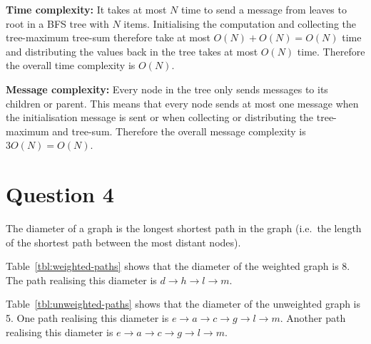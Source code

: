 \documentclass[a4paper,onecolumn,oneside]{article}
\begin{document}
\textbf{Time complexity:}  It takes at most $N$ time to send a message from
leaves to root in a BFS tree with $N$ items.  Initialising the computation and
collecting the tree-maximum tree-sum therefore take at most $O(N) + O(N) = O(N)$
time and distributing the values back in the tree takes at most $O(N)$ time.
Therefore the overall time complexity is $O(N)$.

\textbf{Message complexity:}  Every node in the tree only sends messages to its
children or parent.  This means that every node sends at most one message when
the initialisation message is sent or when collecting or distributing the
tree-maximum and tree-sum.  Therefore the overall message complexity is $3O(N) =
O(N)$.

\section*{Question 4}

The diameter of a graph is the longest shortest path in the graph (i.e.\ the
length of the shortest path between the most distant nodes).

Table~\ref{tbl:weighted-paths} shows that the diameter of the weighted graph is
8.  The path realising this diameter is $d\rightarrow h\rightarrow l\rightarrow
m$.

Table~\ref{tbl:unweighted-paths} shows that the diameter of the unweighted graph
is 5.  One path realising this diameter is $e\rightarrow a\rightarrow
c\rightarrow g\rightarrow l\rightarrow m$.  Another path realising this diameter
is $e\rightarrow a\rightarrow c\rightarrow g\rightarrow l\rightarrow m$.
\end{document}
